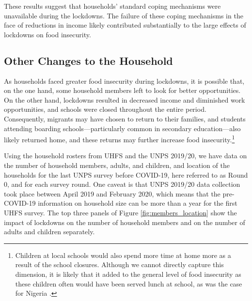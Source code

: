 \documentclass{wber}
\begin{document}
These results suggest that households' standard coping mechanisms were
unavailable during the lockdowns. The failure of these coping mechanisms
in the face of reductions in income likely contributed substantially to
the large effects of lockdowns on food insecurity.

\subsection{Other Changes to the Household}\label{other-changes-to-the-household}

As households faced greater food insecurity during lockdowns, it is
possible that, on the one hand, some household members left to look for
better opportunities. On the other hand, lockdowns resulted in decreased
income and diminished work opportunities, and schools were closed
throughout the entire period. Consequently, migrants may have chosen to
return to their families, and students attending boarding
schools---particularly common in secondary education---also likely
returned home, and these returns may further increase food
insecurity.\footnote{Children at local schools would also spend more
  time at home more as a result of the school closures. Although we
  cannot directly capture this dimension, it is likely that it added to
  the general level of food insecurity as these children often would
  have been served lunch at school, as was the case for Nigeria
  \citep{Abay2021}.}

Using the household rosters from UHFS and the UNPS 2019/20, we have data
on the number of household members, adults, and children, and location
of the households for the last UNPS survey before COVID-19, here
referred to as Round 0, and for each survey round. One caveat is that
UNPS 2019/20 data collection took place between April 2019 and February
2020, which means that the pre-COVID-19 information on household size
can be more than a year for the first UHFS survey. The top three panels
of Figure \ref{fig:members_location} show the impact of lockdowns on the
number of household members and on the number of adults and children
separately.
\end{document}
